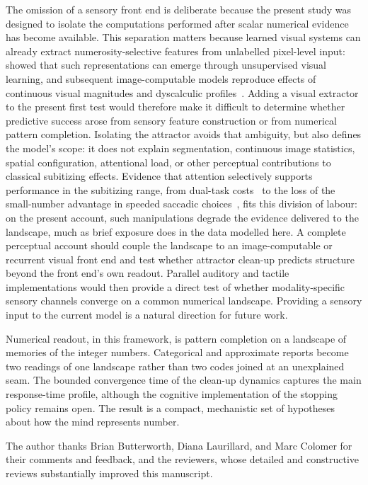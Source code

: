 \documentclass[Afour,sageh,times]{sagej}
\newif\ifmarkrevisions
\newcommand{\revised}[1]{\ifmarkrevisions{\color{red}#1}\else#1\fi}
\begin{document}
The omission of a sensory front end is deliberate because the present study was designed to isolate the computations performed after scalar numerical evidence has become available. This separation matters because learned visual systems can already extract numerosity-selective features from unlabelled pixel-level input: \citet{stoianov_emergence_2012} showed that such representations can emerge through unsupervised visual learning, and subsequent image-computable models reproduce effects of continuous visual magnitudes and dyscalculic profiles~\citep{testolin_visual_2020,dolfi_weaker_2024}. Adding a visual extractor to the present first test would therefore make it difficult to determine whether predictive success arose from sensory feature construction or from numerical pattern completion. Isolating the attractor avoids that ambiguity, but also defines the model's scope: it does not explain segmentation, continuous image statistics, spatial configuration, attentional load, or other perceptual contributions to classical subitizing effects. \revised{Evidence that attention selectively supports performance in the subitizing range, from dual-task costs~\citep{burr_subitizing_2010} to the loss of the small-number advantage in speeded saccadic choices~\citep{castaldi_fast_2020}, fits this division of labour: on the present account, such manipulations degrade the evidence delivered to the landscape, much as brief exposure does in the data modelled here.} A complete perceptual account should couple the landscape to an image-computable or recurrent visual front end and test whether attractor clean-up predicts structure beyond the front end's own readout. Parallel auditory and tactile implementations would then provide a direct test of whether modality-specific sensory channels converge on a common numerical landscape. Providing a sensory input to the current model is a natural direction for future work.

Numerical readout, in this framework, is pattern completion on a landscape of memories of the integer numbers. Categorical and approximate reports become two readings of one landscape rather than two codes joined at an unexplained seam. The bounded convergence time of the clean-up dynamics captures the main response-time profile, although the cognitive implementation of the stopping policy remains open. The result is a compact, mechanistic set of hypotheses about how the mind represents number.

\begin{acks}
The author thanks Brian Butterworth, Diana Laurillard, and Marc Colomer for their comments and feedback, and the reviewers, whose detailed and constructive reviews substantially improved this manuscript.
\end{acks}
\end{document}
